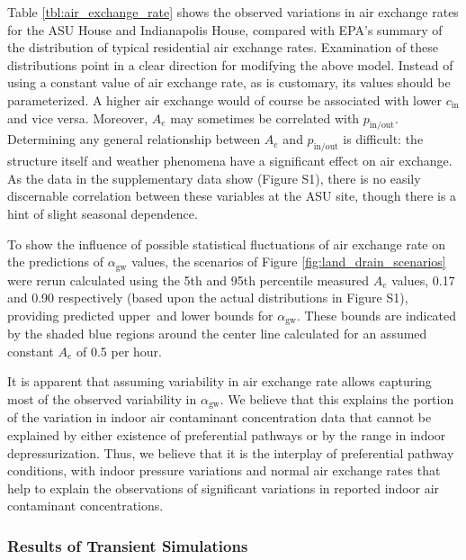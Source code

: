 \documentclass[journal=esthag,manuscript=article]{achemso}
\begin{document}
Table \ref{tbl:air_exchange_rate} shows the observed variations in air exchange rates for the ASU House and Indianapolis House, compared with EPA’s summary of the distribution of typical residential air exchange rates\cite{u.s._epa_exposure_2011,m._d._koontz_estimation_1995}.
Examination of these distributions point in a clear direction for modifying the above model.
Instead of using a constant value of air exchange rate, as is customary, its values should be parameterized.
A higher air exchange would of course be associated with lower $c_\mathrm{in}$ and vice versa.
Moreover, $A_e$ may sometimes be correlated with $p_\mathrm{in/out}$.
Determining any general relationship between $A_e$ and $p_\mathrm{in/out}$ is difficult: the structure itself and weather phenomena have a significant effect on air exchange.
As the data in the supplementary data show (Figure S1), there is no easily discernable correlation between these variables at the ASU site, though there is a hint of slight seasonal dependence.\par

To show the influence of possible statistical fluctuations of air exchange rate on the predictions of $\alpha_\mathrm{gw}$ values, the scenarios of Figure \ref{fig:land_drain_scenarios} were rerun calculated using the 5th and 95th percentile measured $A_e$ values, 0.17 and 0.90 respectively (based upon the actual distributions in Figure S1), providing predicted upper and lower bounds for $\alpha_\mathrm{gw}$.
These bounds are indicated by the shaded blue regions around the center line calculated for an assumed constant $A_e$ of 0.5 per hour.\par

It is apparent that assuming variability in air exchange rate allows capturing most of the observed variability in $\alpha_\mathrm{gw}$.
We believe that this explains the portion of the variation in indoor air contaminant concentration data that cannot be explained by either existence of preferential pathways or by the range in indoor depressurization.
Thus, we believe that it is the interplay of preferential pathway conditions, with indoor pressure variations and normal air exchange rates that help to explain the observations of significant variations in reported indoor air contaminant concentrations.\par

\subsubsection{Results of Transient Simulations}
\end{document}
